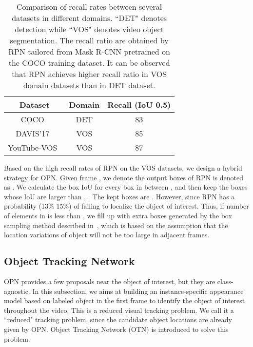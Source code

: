 \documentclass[10pt,twocolumn,letterpaper]{article}
\begin{document}
    \begin{table}
\caption{Comparison of recall rates between several datasets in different domains. ``DET" denotes detection while ``VOS" denotes video object segmentation. The recall ratio are obtained by RPN tailored from Mask R-CNN pretrained on the COCO training dataset. It can be observed that RPN achieves higher recall ratio in VOS domain datasets than in DET dataset.}
    \vspace{3mm}
      \centering
\setlength{\tabcolsep}{2mm}
      {\begin{tabular}{c | c c }
        \toprule
        Dataset                                 & Domain        & Recall (IoU  0.5)    \\
        \midrule
        COCO~\cite{lin2014microsoft}            &  DET          & 83                    \\ DAVIS'17~\cite{davis_eval_cvpr16}       &  VOS          & 85                    \\ YouTube-VOS~\cite{yvos_eccv18}          &  VOS          & 87                    \\ \bottomrule
      \end{tabular}}
      \label{table:recall}
    \end{table}

Based on the high recall rates of RPN on the VOS datasets, we design a hybrid strategy for OPN. Given frame , we denote the output boxes of RPN is denoted as . We calculate the box IoU for every box in  between , and then keep the boxes whose IoU are larger than , \ie . The kept boxes are . However, since RPN has a probability (13\%  15\%) of failing to localize the object of interest. Thus, if number of elements in  is less than , we fill up  with extra boxes generated by the box sampling method described in~\cite{mdnet_cvpr16}, which is based on the assumption that the location variations of object will not be too large in adjacent frames.


\subsection{Object Tracking Network} \label{OTN}
OPN provides a few proposals near the object of interest, but they are class-agnostic. In this subsection, we aims at building an instance-specific appearance model based on labeled object in the first frame to identify the object of interest throughout the video. This is a reduced visual tracking problem. We call it a ``reduced" tracking problem, since the candidate object locations are already given by OPN. Object Tracking Network (OTN) is introduced to solve this problem.
\end{document}
